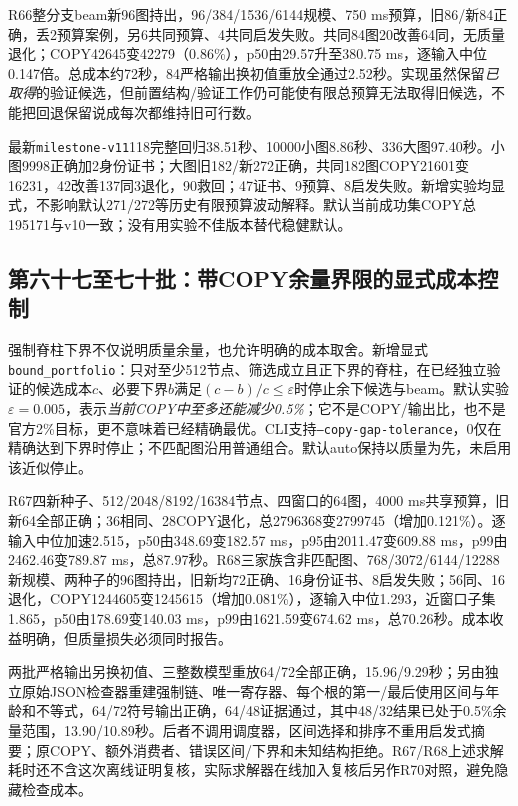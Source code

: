 \documentclass[UTF8,11pt,fontset=fandol]{ctexart}
\begin{document}
R66整分支beam新96图持出，96/384/1536/6144规模、750 ms预算，旧86/新84正确，丢2预算案例，另6共同预算、4共同启发失败。共同84图20改善64同，无质量退化；COPY42645变42279（0.86\%），p50由29.57升至380.75 ms，逐输入中位0.147倍。总成本约72秒，84严格输出换初值重放全通过2.52秒。实现虽然保留\emph{已取得}的验证候选，但前置结构/验证工作仍可能使有限总预算无法取得旧候选，不能把回退保留说成每次都维持旧可行数。

最新\texttt{milestone-v11}118完整回归38.51秒、10000小图8.86秒、336大图97.40秒。小图9998正确加2身份证书；大图旧182/新272正确，共同182图COPY21601变16231，42改善137同3退化，90救回；47证书、9预算、8启发失败。新增实验均显式，不影响默认271/272等历史有限预算波动解释。默认当前成功集COPY总195171与v10一致；没有用实验不佳版本替代稳健默认。

\subsection{第六十七至七十批：带COPY余量界限的显式成本控制}
强制脊柱下界不仅说明质量余量，也允许明确的成本取舍。新增显式\texttt{bound\_portfolio}：只对至少512节点、筛选成立且正下界的脊柱，在已经独立验证的候选成本$c$、必要下界$b$满足$(c-b)/c\leq\varepsilon$时停止余下候选与beam。默认实验$\varepsilon=0.005$，表示\emph{当前COPY中至多还能减少0.5\%}；它不是COPY/输出比，也不是官方2\%目标，更不意味着已经精确最优。CLI支持\texttt{--copy-gap-tolerance}，0仅在精确达到下界时停止；不匹配图沿用普通组合。默认auto保持以质量为先，未启用该近似停止。

R67四新种子、512/2048/8192/16384节点、四窗口的64图，4000 ms共享预算，旧新64全部正确；36相同、28COPY退化，总2796368变2799745（增加0.121\%）。逐输入中位加速2.515，p50由348.69变182.57 ms，p95由2011.47变609.88 ms，p99由2462.46变789.87 ms，总87.97秒。R68三家族含非匹配图、768/3072/6144/12288新规模、两种子的96图持出，旧新均72正确、16身份证书、8启发失败；56同、16退化，COPY1244605变1245615（增加0.081\%），逐输入中位1.293，近窗口子集1.865，p50由178.69变140.03 ms，p99由1621.59变674.62 ms，总70.26秒。成本收益明确，但质量损失必须同时报告。

两批严格输出另换初值、三整数模型重放64/72全部正确，15.96/9.29秒；另由独立原始JSON检查器重建强制链、唯一寄存器、每个根的第一/最后使用区间与年龄和不等式，64/72符号输出正确，64/48证据通过，其中48/32结果已处于0.5\%余量范围，13.90/10.89秒。后者不调用调度器，区间选择和排序不重用启发式摘要；原COPY、额外消费者、错误区间/下界和未知结构拒绝。R67/R68上述求解耗时还不含这次离线证明复核，实际求解器在线加入复核后另作R70对照，避免隐藏检查成本。
\end{document}
